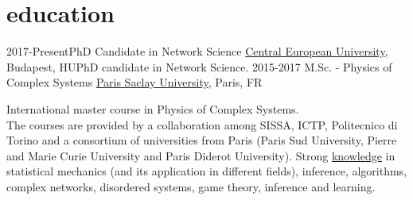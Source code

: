 \documentclass[]{cv-style}     %
\begin{document}
\section{education}
\begin{entrylist}
\entry
{2017-Present}{PhD Candidate in Network Science}
{\href{http://www.ceu.edu}{Central European University}, Budapest, HU}{PhD candidate in Network Science.}
\entry
{2015-2017}
{M.Sc. - Physics of Complex Systems%
}
{%
\href{https://www.universite-paris-saclay.fr/en}{Paris Saclay University}, Paris, FR
}
{\normalfont International master course in Physics of Complex Systems.\\
The courses are provided by a collaboration among SISSA, ICTP, Politecnico di Torino
and a consortium of universities from Paris (Paris Sud University, Pierre and Marie Curie University and Paris Diderot University).
Strong \href{http://www.lps.ens.fr/~benamar/sc/physics-of-complex-systems/}{knowledge} in statistical mechanics (and its application in different fields), inference, algorithms, complex networks, disordered systems, game theory, inference and learning.

}
\end{entrylist}
\end{document}
